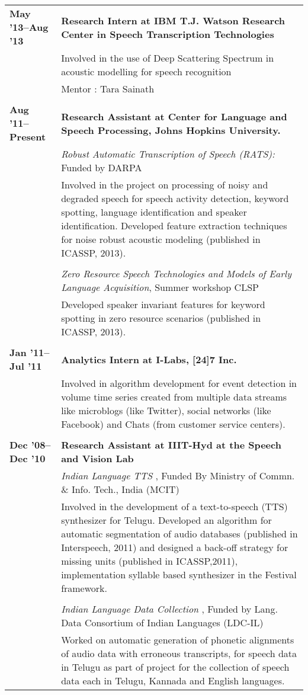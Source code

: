 \documentclass[margin,line,pifont,palatino,courier]{res}
\begin{document}
\begin{resume}
\begin{longtable}{@{}p{1.2in}p{3.8in}}
\textbf{May '13--Aug '13} & \textbf{Research Intern at IBM T.J. Watson Research Center in Speech Transcription Technologies} \\
& Involved in the use of Deep Scattering Spectrum in acoustic modelling for speech recognition\\
& Mentor : Tara Sainath \\
&\\
\textbf{Aug '11--Present} & \textbf{Research Assistant at Center for Language and Speech Processing, Johns Hopkins University.} \\
&\textit{Robust Automatic Transcription of Speech (RATS):} Funded by DARPA \\
&Involved in the project on processing of noisy and degraded speech for speech activity detection, keyword spotting, language identification and speaker identification. Developed feature extraction techniques for noise robust acoustic modeling (published in ICASSP, 2013).\\
&\\
&\textit{Zero Resource Speech Technologies and Models of Early Language Acquisition}, Summer workshop CLSP\\
&Developed speaker invariant features for keyword spotting in zero resource scenarios (published in ICASSP, 2013).\\
&\\
\textbf{Jan '11--Jul '11} & \textbf{Analytics Intern at I-Labs, [24]7 Inc.} \\
&Involved in algorithm development for event detection in volume time series created from multiple data streams like microblogs (like Twitter), social networks (like Facebook) and Chats (from customer service centers).\\
&\\
\textbf{Dec '08--Dec '10 }& \textbf{Research Assistant at IIIT-Hyd at the Speech and Vision Lab} \\

&\textit{Indian Language TTS} ,
Funded By Ministry of Commn. \& Info. Tech., India (MCIT)\\
&Involved in the development of a text-to-speech (TTS) synthesizer for Telugu. Developed an algorithm for automatic segmentation of audio databases (published in Interspeech, 2011) and designed a back-off strategy for missing units (published in ICASSP,2011), implementation syllable based synthesizer in the Festival framework.\\
&\\
&\textit{Indian Language Data Collection} , 
Funded by Lang. Data Consortium of Indian Languages (LDC-IL)\\
&Worked on automatic generation of phonetic alignments of audio data with erroneous transcripts, for speech data in Telugu as part of project for the collection of speech data each in Telugu, Kannada and English languages.\\


\end{longtable}
\end{resume}
\end{document}

